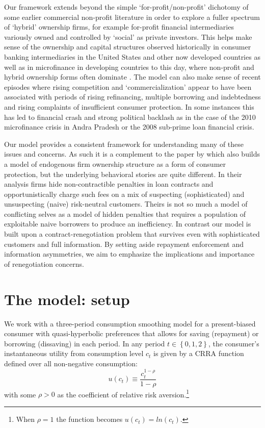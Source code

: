 \documentclass[11pt,english]{article}
\theoremstyle{plain}
\theoremstyle{definition}
\begin{document}
Our framework extends beyond the simple `for-profit/non-profit' dichotomy
of some earlier commercial non-profit literature in order to explore
a fuller spectrum of `hybrid' ownership firms, for example for-profit financial
intermediaries variously owned and controlled by `social' as private investors. This helps make sense of the ownership and
capital structures observed historically in consumer banking intermediaries
in the United States and other now developed countries as well as
in microfinance in developing countries to this day, where non-profit
and hybrid ownership forms often dominate \citep{cull2009}. The model
can also make sense of recent episodes where rising competition and
`commercialization' appear to have been associated with periods of
rising refinancing, multiple borrowing and indebtedness and rising
complaints of insufficient consumer protection. In some instances
this has led to financial crash and strong political backlash as in
the case of the 2010 microfinance crisis in Andra Pradesh or the 2008
sub-prime loan financial crisis.

Our model provides a consistent framework for understanding many of
these issues and concerns. As such it is a complement to the paper
by \citet{bubb2013} which also builds a model of endogenous
firm ownership structure as a form of consumer protection, but the
underlying behavioral stories are quite different. In their analysis
firms hide non-contractible penalties in loan contracts and opportunistically
charge such fees on a mix of suspecting (sophisticated) and unsuspecting
(naive) risk-neutral customers. Theirs is not so much a model of conflicting
selves as a model of hidden penalties that requires a population of
exploitable naive borrowers to produce an inefficiency. In contrast
our model is built upon a contract-renegotiation problem that survives
even with sophisticated customers and full information. By setting
aside repayment enforcement and information asymmetries, we aim to
emphasize the implications and importance of renegotiation concerns.

\section{The model: setup}

We work with a three-period consumption smoothing model for a present-biased
consumer with quasi-hyperbolic preferences that allows for saving
(repayment) or borrowing (dissaving) in each period. In any period
$t\in\left\{ 0,1,2\right\} $, the consumer's instantaneous utility
from consumption level $c_{t}$ is given by a CRRA function defined
over all non-negative consumption: 
\begin{equation}
u\left(c_{t}\right)\equiv\frac{c_{t}^{1-\rho}}{1-\rho}
\end{equation}
with some $\rho>0$ as the coefficient of relative risk aversion.\footnote{When $\rho=1$ the function becomes $u(c_{t})=ln(c_{t})$.}
\end{document}
